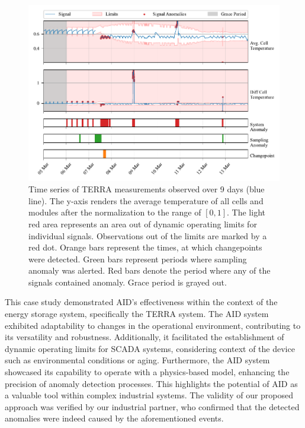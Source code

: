 \begin{figure}[htbp]
\centerline{\includegraphics{figures/TERRA_thresh_4days.pdf}}
\caption{Time series of TERRA measurements observed over 9 days (blue line). The y-axis renders the average temperature of all cells and modules after the normalization to the range of $[0, 1]$. The light red area represents an area out of dynamic operating limits for individual signals. Observations out of the limits are marked by a red dot. Orange bars represent the times, at which changepoints were detected. Green bars represent periods where sampling anomaly was alerted. Red bars denote the period where any of the signals contained anomaly. Grace period is grayed out.}
\label{fig:terra_multi}
\end{figure}

This case study demonstrated AID's effectiveness  within the context of the energy storage system, specifically the TERRA system. The AID system exhibited adaptability to changes in the operational environment, contributing to its versatility and robustness. Additionally, it facilitated the establishment of dynamic operating limits for SCADA systems, considering context of the device such as environmental conditions or aging. Furthermore, the AID system showcased its capability to operate with a physics-based model, enhancing the precision of anomaly detection processes. This highlights the potential of AID as a valuable tool within complex industrial systems. The validity of our proposed approach was verified by our industrial partner, who confirmed that the detected anomalies were indeed caused by the aforementioned events.


